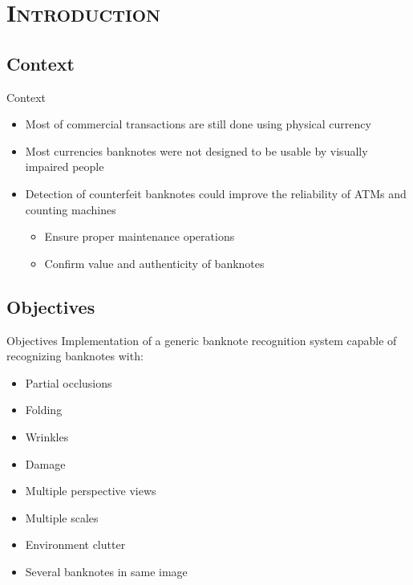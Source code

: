 \section{\scshape Introduction}\label{sec:introduction}

\subsection{Context}
\begin{frame}{Context}
	\begin{itemize}
		\item Most of commercial transactions are still done using physical currency
		\item Most currencies banknotes were not designed to be usable by visually impaired people
		\item Detection of counterfeit banknotes could improve the reliability of ATMs and counting machines
		\begin{itemize}
			\item Ensure proper maintenance operations
			\item Confirm value and authenticity of banknotes
		\end{itemize}
	\end{itemize}
\end{frame}


\subsection{Objectives}
\begin{frame}{Objectives}
	Implementation of a generic banknote recognition system capable of recognizing banknotes with:
	\begin{itemize}
		\item Partial occlusions
		\item Folding
		\item Wrinkles
		\item Damage
		\item Multiple perspective views
		\item Multiple scales
		\item Environment clutter
		\item Several banknotes in same image
	\end{itemize}
\end{frame}
